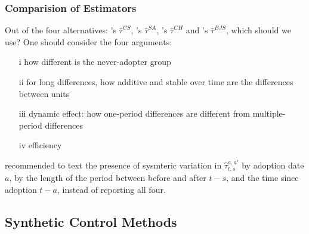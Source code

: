 \documentclass[twoside]{article}
\begin{document}
\subsubsection{Comparision of Estimators}
Out of the four alternatives: \citet{callaway2021difference}'s $\hat{\tau}^{CS}$, \citet{sun2021estimating}'s $\hat{\tau}^{SA}$, \citet{de2020two}'s $\hat{\tau}^{CH}$ and \citet{borusyak2024revisiting}'s $\hat{\tau}^{BJS}$, which should we use?
One should consider the four arguments:
\begin{itemize}
    \item[i] how different is the never-adopter group 
    \item[ii] for long differences, how additive and stable over time are the differences between units
    \item[iii] dynamic effect: how one-period differences are different from multiple-period differences 
    \item[iv] efficiency 
\end{itemize}
\citet{arkhangelsky2023causal} recommended to text the presence of sysmteric variation in $\hat{\tau}^{a,a'}_{t,s}$ by adoption date $a$, by the length of the period between before and after $t-s$, and the time since adoption $t-a$, instead of reporting all four.

\subsection{Synthetic Control Methods}
\end{document}
